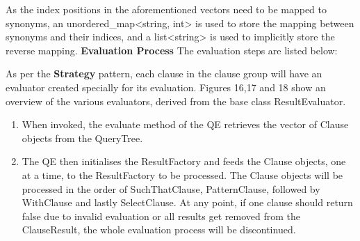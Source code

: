\documentclass[12pt]{article}
\begin{document}
{{{{{{{{{{As the index positions in the aforementioned vectors need to be mapped to synonyms, an unordered\_map<string, int> is used to store the mapping between synonyms and their indices, and a list<string> is used to implicitly store the reverse mapping.
\newline \textbf{Evaluation Process} \newline
The evaluation steps are listed below:

As per the \textbf{Strategy} pattern, each clause in the clause group will have an evaluator created specially for its evaluation. Figures 16,17 and 18 show an overview of the various evaluators, derived from the base class ResultEvaluator. 
\begin{enumerate}
\item When invoked, the evaluate method of the QE retrieves the vector of Clause objects from the QueryTree.
  
\item The QE then initialises the ResultFactory and feeds the Clause objects, one at a time, to the ResultFactory to be processed. The Clause objects will be processed in the order of SuchThatClause, PatternClause, followed by WithClause and lastly SelectClause. At any point, if one clause should return false due to invalid evaluation or all results get removed from the ClauseResult, the whole evaluation process will be discontinued.


\end{enumerate}}}}}}}}}}}
\end{document}
